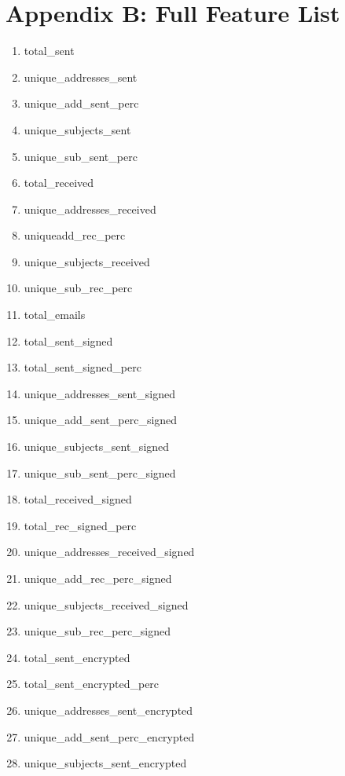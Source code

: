 \documentclass[12pt]{report}
\begin{document}



\chapter*{Appendix B: Full Feature List}

\begin{multicols}{2}
\begin{enumerate}
	\setlength\itemsep{-1em}
	\item total\_sent
	\item unique\_addresses\_sent
	\item unique\_add\_sent\_perc
	\item unique\_subjects\_sent
	\item unique\_sub\_sent\_perc
	\item total\_received
	\item unique\_addresses\_received
	\item uniqueadd\_rec\_perc
	\item unique\_subjects\_received
	\item unique\_sub\_rec\_perc
	\item total\_emails
	\item total\_sent\_signed
	\item total\_sent\_signed\_perc
	\item unique\_addresses\_sent\_signed
	\item unique\_add\_sent\_perc\_signed
	\item unique\_subjects\_sent\_signed
	\item unique\_sub\_sent\_perc\_signed
	\item total\_received\_signed
	\item total\_rec\_signed\_perc
	\item unique\_addresses\_received\_signed
	\item unique\_add\_rec\_perc\_signed
	\item unique\_subjects\_received\_signed
	\item unique\_sub\_rec\_perc\_signed
	\item total\_sent\_encrypted
	\item total\_sent\_encrypted\_perc
	\item unique\_addresses\_sent\_encrypted
	\item unique\_add\_sent\_perc\_encrypted
	\item unique\_subjects\_sent\_encrypted

\end{enumerate}
\end{multicols}
\end{document}
